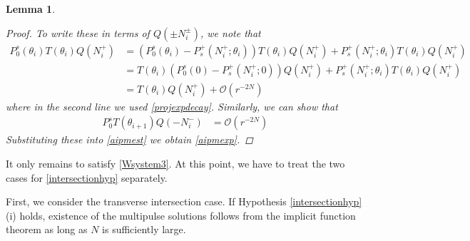 \documentclass[12pt]{article}
\newtheorem{lemma}{Lemma}
\begin{document}
\begin{lemma}
\begin{proof}
To write these in terms of $Q(\pm N_i^\pm)$, we note that
\begin{align*}
P_0^s(\theta_i) T(\theta_i) Q(N_i^+) &= (P_0^s(\theta_i) - P_s^+(N_i^+; \theta_i)) T(\theta_i) Q(N_i^+) + P_s^+(N_i^+; \theta_i) T(\theta_i) Q(N_i^+) \\
&= T(\theta_i)(P_0^s(0) - P_s^+(N_i^+; 0)) Q(N_i^+) + P_s^+(N_i^+; \theta_i) T(\theta_i) Q(N_i^+) \\
&= T(\theta_i) Q(N_i^+) + \mathcal{O}(r^{-2N}) 
\end{align*}
where in the second line we used \eqref{projexpdecay}. Similarly, we can show that 
\begin{align*}
P_0^s T(\theta_{i+1}) Q(-N_i^-) &= \mathcal{O}(r^{-2N})
\end{align*}
Substituting these into \eqref{aipmest} we obtain \eqref{aipmexp}.
\end{proof}
\end{lemma}

It only remains to satisfy \eqref{Wsystem3}. At this point, we have to treat the two cases for \ref{intersectionhyp} separately.

First, we consider the transverse intersection case. If  Hypothesis \ref{intersectionhyp}(i) holds, existence of the multipulse solutions follows from the implicit function theorem as long as $N$ is sufficiently large.
\end{document}
